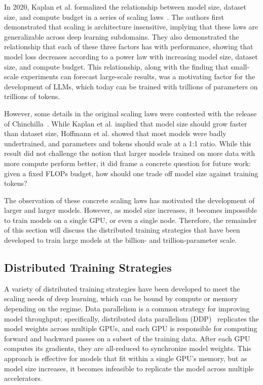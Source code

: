 In 2020, Kaplan et al. formalized the relationship between model size, dataset size, and compute budget in a series of scaling laws~\cite{kaplan2020scaling}. The authors first demonstrated that scaling is architecture insensitive, implying that these laws are generalizable across deep learning subdomains. They also demonstrated the relationship that each of these three factors has with performance, showing that model loss decreases according to a power law with increasing model size, dataset size, and compute budget. This relationship, along with the finding that small-scale experiments can forecast large-scale results, was a motivating factor for the development of LLMs, which today can be trained with trillions of parameters on trillions of tokens.

However, some details in the original scaling laws were contested with the release of Chinchilla~\cite{hoffmann2022training}. While Kaplan et al. implied that model size should grow faster than dataset size, Hoffmann et al. showed that most models were badly undertrained, and parameters and tokens should scale at a 1:1 ratio. While this result did not challenge the notion that larger models trained on more data with more compute perform better, it did frame a concrete question for future work: given a fixed FLOPs budget, how should one trade off model size against training tokens?

The observation of these concrete scaling laws has motivated the development of larger and larger models. However, as model size increases, it becomes impossible to train models on a single GPU, or even a single node. Therefore, the remainder of this section will discuss the distributed training strategies that have been developed to train large models at the billion- and trillion-parameter scale.

\subsection{Distributed Training Strategies}\label{sec:ch1-distributed}
A variety of distributed training strategies have been developed to meet the scaling needs of deep learning, which can be bound by compute or memory depending on the regime. Data parallelism is a common strategy for improving model throughput; specifically, distributed data parallelism (DDP)~\cite{li2020pytorch} replicates the model weights across multiple GPUs, and each GPU is responsible for computing forward and backward passes on a subset of the training data. After each GPU computes its gradients, they are all-reduced to synchronize model weights. This approach is effective for models that fit within a single GPU's memory, but as model size increases, it becomes infeasible to replicate the model across multiple accelerators.

